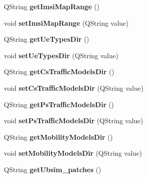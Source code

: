 \begin{DoxyCompactItemize}
\item 
Q\+String {\bfseries get\+Imsi\+Map\+Range} ()\hypertarget{class_ue_a8a0cffbea8670f9179762dd188d2381a}{}\label{class_ue_a8a0cffbea8670f9179762dd188d2381a}

\item 
void {\bfseries set\+Imsi\+Map\+Range} (Q\+String value)\hypertarget{class_ue_a8dca2c5064659d6a9dcedba2a80a7876}{}\label{class_ue_a8dca2c5064659d6a9dcedba2a80a7876}

\item 
Q\+String {\bfseries get\+Ue\+Types\+Dir} ()\hypertarget{class_ue_aa28f5543c2463db1b163abe9f20aacf8}{}\label{class_ue_aa28f5543c2463db1b163abe9f20aacf8}

\item 
void {\bfseries set\+Ue\+Types\+Dir} (Q\+String value)\hypertarget{class_ue_acca52928e45bbb7ee626c49e0ff6fc4b}{}\label{class_ue_acca52928e45bbb7ee626c49e0ff6fc4b}

\item 
Q\+String {\bfseries get\+Cs\+Traffic\+Models\+Dir} ()\hypertarget{class_ue_a8e243895b6e0907d2879f0cb6f48c36b}{}\label{class_ue_a8e243895b6e0907d2879f0cb6f48c36b}

\item 
void {\bfseries set\+Cs\+Traffic\+Models\+Dir} (Q\+String value)\hypertarget{class_ue_a8605e26a0187b76f9eac8f64e922c369}{}\label{class_ue_a8605e26a0187b76f9eac8f64e922c369}

\item 
Q\+String {\bfseries get\+Ps\+Traffic\+Models\+Dir} ()\hypertarget{class_ue_a9cfa0341bbc431b552f7da8183665e13}{}\label{class_ue_a9cfa0341bbc431b552f7da8183665e13}

\item 
void {\bfseries set\+Ps\+Traffic\+Models\+Dir} (Q\+String value)\hypertarget{class_ue_ad9bd0b27c7eb3b07b72ba46bff973560}{}\label{class_ue_ad9bd0b27c7eb3b07b72ba46bff973560}

\item 
Q\+String {\bfseries get\+Mobility\+Models\+Dir} ()\hypertarget{class_ue_a1d9be0eaedbe193533aa489fb5dbb86f}{}\label{class_ue_a1d9be0eaedbe193533aa489fb5dbb86f}

\item 
void {\bfseries set\+Mobility\+Models\+Dir} (Q\+String value)\hypertarget{class_ue_af3109861c507f1fcc6078379f10d238e}{}\label{class_ue_af3109861c507f1fcc6078379f10d238e}

\item 
Q\+String {\bfseries get\+Ubsim\+\_\+patches} ()\hypertarget{class_ue_ac70f0ac284c349611f2db7b8a7ebe983}{}\label{class_ue_ac70f0ac284c349611f2db7b8a7ebe983}


\end{DoxyCompactItemize}
